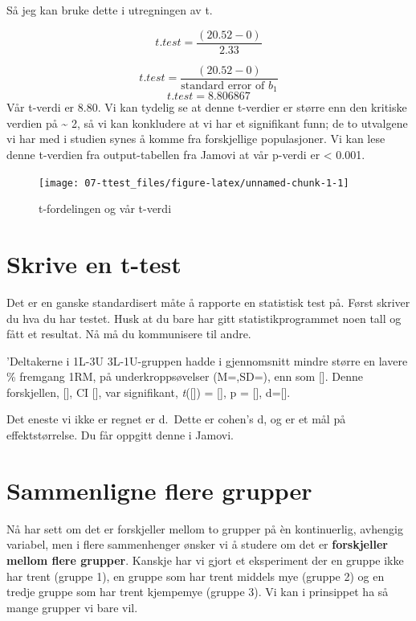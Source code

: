\documentclass[
]{book}
\begin{document}
Så jeg kan bruke dette i utregningen av t.

\[
t.test = \frac{(20.52 - 0)}{2.33}
\]

\[
t.test = \frac{(20.52 - 0)}{\text{standard error of } b_1}
\]
\[
t.test = 8.806867
\]
Vår t-verdi er 8.80. Vi kan tydelig se at denne t-verdier er større enn den kritiske verdien på \textasciitilde{} 2, så vi kan konkludere at vi har et signifikant funn; de to utvalgene vi har med i studien synes å komme fra forskjellige populasjoner. Vi kan lese denne t-verdien fra output-tabellen fra Jamovi at vår p-verdi er \textless{} 0.001.

\begin{figure}

{\centering \texttt{[image: 07-ttest\_files/figure-latex/unnamed-chunk-1-1]} 

}

\caption{t-fordelingen og vår t-verdi}\label{fig:unnamed-chunk-1}
\end{figure}

\hypertarget{skrive-en-t-test}{%
\chapter{Skrive en t-test}\label{skrive-en-t-test}}

Det er en ganske standardisert måte å rapporte en statistisk test på. Først skriver du hva du har testet. Husk at du bare har gitt statistikprogrammet noen tall og fått et resultat. Nå må du kommunisere til andre.

'Deltakerne i 1L-3U 3L-1U-gruppen hadde i gjennomsnitt mindre større en lavere \% fremgang 1RM, på underkroppsøvelser (M=,SD=), enn som {[}{]}. Denne forskjellen, {[}{]}, CI {[}{]}, var signifikant, \emph{t}({[}{]}) = {[}{]}, p = {[}{]}, d={[}{]}.

Det eneste vi ikke er regnet er d.~Dette er cohen's d, og er et mål på effektstørrelse. Du får oppgitt denne i Jamovi.

\hypertarget{sammenligne-flere-grupper}{%
\chapter{Sammenligne flere grupper}\label{sammenligne-flere-grupper}}

Nå har sett om det er forskjeller mellom to grupper på èn kontinuerlig, avhengig variabel, men i flere sammenhenger ønsker vi å studere om det er \textbf{forskjeller mellom flere grupper}. Kanskje har vi gjort et eksperiment der en gruppe ikke har trent (gruppe 1), en gruppe som har trent middels mye (gruppe 2) og en tredje gruppe som har trent kjempemye (gruppe 3). Vi kan i prinsippet ha så mange grupper vi bare vil.
\end{document}
